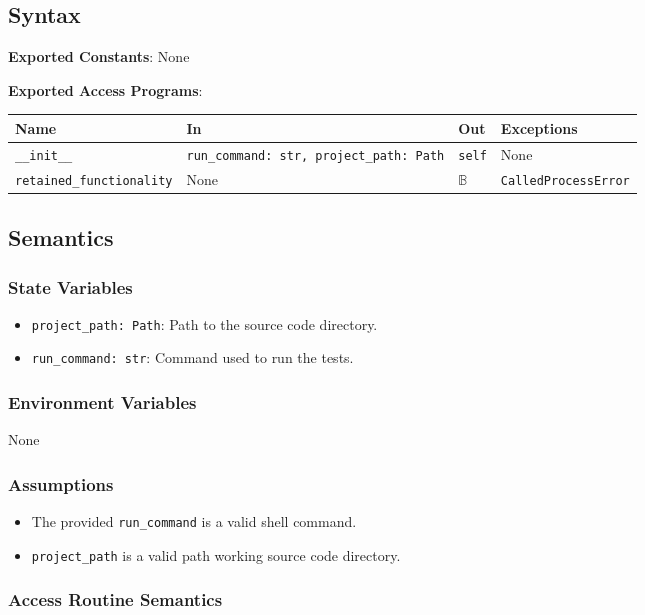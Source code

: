 \documentclass[12pt, titlepage]{article}
\begin{document}
\subsection{Syntax}
\noindent
\textbf{Exported Constants}: None

\noindent
\textbf{Exported Access Programs}:

\begin{tabularx}{\linewidth}{|l|>{\raggedright\arraybackslash}X|l|l|}
\hline
\textbf{Name} & \textbf{In} & \textbf{Out} & \textbf{Exceptions} \\
\hline
\texttt{\_\_init\_\_} & \texttt{run\_command: str, project\_path: Path} & \texttt{self} & None \\
\hline
\texttt{retained\_functionality} & None & $\mathbb{B}$ & \texttt{CalledProcessError} \\
\hline
\end{tabularx}

\subsection{Semantics}

\subsubsection{State Variables}
\begin{itemize}
  \item \texttt{project\_path: Path}: Path to the source code directory.
  \item \texttt{run\_command: str}: Command used to run the tests.
\end{itemize}

\subsubsection{Environment Variables}
None

\subsubsection{Assumptions}
\begin{itemize}
  \item The provided \texttt{run\_command} is a valid shell command.
  \item \texttt{project\_path} is a valid path working source code directory.
\end{itemize}

\subsubsection{Access Routine Semantics}
\end{document}

